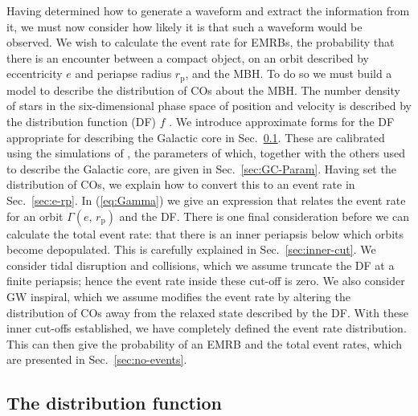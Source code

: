\documentclass[useAMS,usedcolumn,usegraphicx,usenatbib]{mn2e}
\newcommand{\eqnref}[1]{(\ref{eq:#1})}
\newcommand{\secref}[1]{Sec.~\ref{sec:#1}}
\newcommand{\sub}[1]{\ensuremath{_\mathrm{#1}}}
\begin{document}
Having determined how to generate a waveform and extract the information from it, we must now consider how likely it is that such a waveform would be observed. We wish to calculate the event rate for EMRBs, the probability that there is an encounter between a compact object, on an orbit described by eccentricity $e$ and periapse radius $r\sub{p}$, and the MBH. To do so we must build a model to describe the distribution of COs about the MBH. The number density of stars in the six-dimensional phase space of position and velocity is described by the distribution function (DF) $f$ \citep[section 4.1]{Binney2008}. We introduce approximate forms for the DF appropriate for describing the Galactic core in \secref{DF}. These are calibrated using the simulations of \citet{Alexander2009}, the parameters of which, together with the others used to describe the Galactic core, are given in \secref{GC-Param}. Having set the distribution of COs, we explain how to convert this to an event rate in \secref{e-rp}. In \eqnref{Gamma} we give an expression that relates the event rate for an orbit $\Gamma(e,\,r\sub{p})$ and the DF. There is one final consideration before we can calculate the total event rate: that there is an inner periapsis below which orbits become depopulated. This is carefully explained in \secref{inner-cut}. We consider tidal disruption and collisions, which we assume truncate the DF at a finite periapsis; hence the event rate inside these cut-off is zero. We also consider GW inspiral, which we assume modifies the event rate by altering the distribution of COs away from the relaxed state described by the DF. With these inner cut-offs established, we have completely defined the event rate distribution. This can then give the probability of an EMRB and the total event rates, which are presented in \secref{no-events}.

\subsection{The distribution function}\label{sec:DF}
\end{document}
